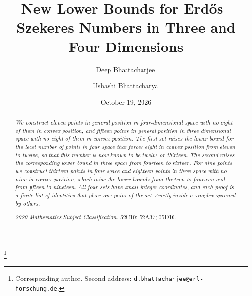 \documentclass[aps,prd,twocolumn,superscriptaddress,nofootinbib,longbibliography,floatfix,showkeys,amsmath,amssymb,10pt]{revtex4-2}
\theoremstyle{plain}
\theoremstyle{definition}
\theoremstyle{plain}
\begin{document}
\title{New Lower Bounds for Erd\H{o}s--Szekeres Numbers in Three and Four Dimensions}

\author{Deep Bhattacharjee\,}
\thanks{Corresponding author. Second address: \nolinkurl{d.bhattacharjee@erl-forschung.de}.}

\author{Ushashi Bhattacharya\,}

\date{October 19, 2026}

\begin{abstract}
\itshape
We construct eleven points in general position in four-dimensional space with no eight of them in convex position, and fifteen points in general position in three-dimensional space with no eight of them in convex position. The first set raises the lower bound for the least number of points in four-space that forces eight in convex position from eleven to twelve, so that this number is now known to be twelve or thirteen. The second raises the corresponding lower bound in three-space from fourteen to sixteen. For nine points we construct thirteen points in four-space and eighteen points in three-space with no nine in convex position, which raise the lower bounds from thirteen to fourteen and from fifteen to nineteen. All four sets have small integer coordinates, and each proof is a finite list of identities that place one point of the set strictly inside a simplex spanned by others.
\par\medskip\upshape\noindent\textit{2020 Mathematics Subject Classification.} 52C10; 52A37; 05D10.
\end{abstract}


\maketitle
\makeatletter\renewcommand\l@subsection[2]{}\renewcommand\l@subsubsection[2]{}\makeatother
\tableofcontents

\end{document}
